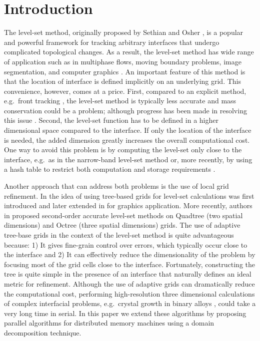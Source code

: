 \section{Introduction}\label{sec:introduction}
The level-set method, originally proposed by Sethian and Osher \cite{Osher;Sethian:88:Fronts-Propagating-w}, is a popular and powerful framework for tracking arbitrary interfaces that undergo complicated topological changes. As a result, the level-set method has wide range of application such as in multiphase flows, moving boundary problems, image segmentation, and computer graphics \cite{Osher;Fedkiw:01:Level-Set-Methods:-A,Sethian:99:Level-set-methods-an}. An important feature of this method is that the location of interface is defined implicitly on an underlying grid. This convenience, however, comes at a price. First, compared to an explicit method, e.g.\ front tracking \cite{Juric:96:A-Front-Tracking-Met, Tryggvason;Bunner;Esmaeeli;etal:01:A-Front-Tracking-Met}, the level-set method is typically less accurate and mass conservation could be a problem; although progress has been made in resolving this issue \cite{Enright;Fedkiw;Ferziger;etal:02:A-Hybrid-Particle-Le}. Second, the level-set function has to be defined in a higher dimensional space compared to the interface. If only the location of the interface is needed, the added dimension greatly increases the overall computational cost. One way to avoid this problem is by computing the level-set only close to the interface, e.g.\ as in the narrow-band level-set method \cite{Adalsteinsson;Sethian:95:A-Fast-Level-Set-Met} or, more recently, by using a hash table to restrict both computation and storage requirements \cite{Brun;Guittet;Gibou:12:A-local-level-set-me}.

Another approach that can address both problems is the use of local grid refinement. In \cite{Strain:99:Tree-Methods-for-Mov} the idea of using tree-based grids for level-set calculations was first introduced and later extended in \cite{Losasso;Gibou;Fedkiw:04:Simulating-Water-and} for graphics application. More recently, authors in \cite{Min;Gibou:07:A-second-order-accur} proposed second-order accurate level-set methods on Quadtree (two spatial dimensions) and Octree (three spatial dimensions) grids. The use of adaptive tree-base grids in the context of the level-set method is quite advantageous because: 1) It gives fine-grain control over errors, which typically occur close to the interface and 2) It can effectively reduce the dimensionality of the problem by focusing most of the grid cells close to the interface. Fortunately, constructing the tree is quite simple in the presence of an interface that naturally defines an ideal metric for refinement. Although the use of adaptive grids can dramatically reduce the computational cost, performing high-resolution three dimensional calculations of complex interfacial problems, e.g.\ crystal growth in binary alloys \cite{Theillard;Gibou;Pollock:14:A-Sharp-Computationa}, could take a very long time in serial. In this paper we extend these algorithms by proposing parallel algorithms for distributed memory machines using a domain decomposition technique.

